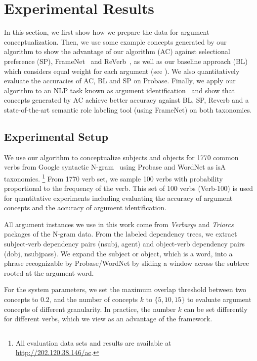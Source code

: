 \section{Experimental Results}
\label{sec:eval}

In this section, we first show how we prepare the data for argument
conceptualization. Then, we use some example concepts
generated by our algorithm to show the advantage of our algorithm (AC)
against selectional preference (SP), FrameNet~\cite{baker1998berkeley} and ReVerb~\cite{fader2011identifying},
as well as our baseline approach (BL) which considers equal
weight for each argument (see ).
We also quantitatively evaluate the accuracies of AC, BL and SP
on Probase. Finally, we apply our algorithm to
an NLP task known as argument
identification~\cite{gildea2002necessity,abend2009unsupervised,meza2009jointly}
and show that concepts generated by AC
achieve better accuracy against BL, SP,
Reverb and a state-of-the-art semantic role labeling tool (using FrameNet) on both taxonomies.

\subsection{Experimental Setup}
\label{sec:preprocess}

We use our algorithm to conceptualize subjects and objects
for 1770 common verbs from Google syntactic
N-gram~\cite{goldberg2013dataset,googlengram} using
Probase and WordNet as isA taxonomies.
\footnote{All evaluation data sets and results
are available at \url{http://202.120.38.146/ac}.}
From 1770 verb set, we
sample 100 verbs with probability proportional to
the frequency of the verb. This set of 100 verbs (Verb-100) is
used for quantitative experiments including evaluating the
accuracy of argument concepts and the accuracy of
argument identification.

All argument instances we use in this work come
from {\em Verbargs} and {\em Triarcs} packages
of the N-gram data.
From the labeled dependency trees, we extract
subject-verb dependency pairs (nsubj, agent) and
object-verb dependency pairs (dobj, nsubjpass).
We expand the subject or object, which is a word, into
a phrase recognizable by Probase/WordNet by sliding a window
across the subtree rooted at the argument word.

For the system parameters, we set the maximum overlap
threshold between two concepts to 0.2, and the number of concepts
$k$ to $\{5, 10, 15\}$ to evaluate argument concepts of
different granularity.
In practice, the number $k$ can be set differently for different verbs,
which we view as an advantage of the framework.


